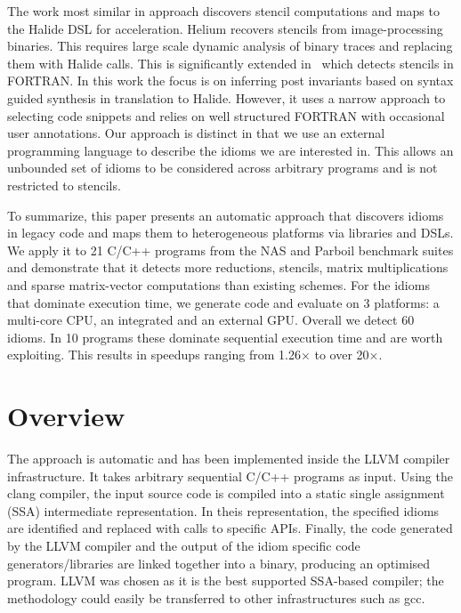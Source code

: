     The work most similar in approach discovers stencil computations and maps to
    the Halide DSL for acceleration.
    Helium \cite{Mendis2015Helium} recovers stencils from image-processing
    binaries.
    This requires large scale dynamic analysis of binary traces and replacing
    them with Halide calls. 
    This is significantly extended in~\cite{Kamil2016Verified} which detects
    stencils in FORTRAN.
    In this work the focus is on inferring post invariants based on syntax
    guided synthesis in translation to Halide.
    However, it uses a narrow approach to selecting code snippets and relies on
    well structured FORTRAN with occasional user annotations.
    Our approach is distinct in that we use an external  programming language to
    describe the idioms we are interested in.
    This allows an unbounded set of idioms  to be considered across arbitrary
    programs and is not restricted to stencils. 

    To summarize, this paper presents an automatic approach that discovers
    idioms in legacy code and maps them to heterogeneous platforms via libraries
    and DSLs.
    We apply it to 21 C/C++ programs from the NAS and Parboil benchmark suites
    and demonstrate that it detects more reductions, stencils, matrix
    multiplications and sparse matrix-vector computations than existing schemes.
    For the idioms that dominate execution time, we generate code and evaluate
    on 3 platforms: a multi-core CPU, an integrated and an external GPU.
    Overall we detect 60 idioms.
    In 10 programs these dominate sequential execution time and are worth
    exploiting.
    This results in speedups ranging from 1.26$\times$ to over 20$\times$.

\section{Overview}

    The approach is automatic and has been implemented inside the LLVM compiler
    infrastructure.
    It takes arbitrary sequential C/C++ programs as input.
    Using the clang compiler, the input source code is compiled into a static
    single assignment (SSA) intermediate representation.
    In theis representation, the specified idioms are identified and replaced
    with calls to specific APIs.
    Finally, the code generated by the LLVM compiler and the output of the idiom
    specific code generators/libraries are linked together into a binary,
    producing an optimised program.
    LLVM was chosen as it is the best supported SSA-based compiler;
    the methodology could easily be transferred to other infrastructures such as
    gcc.

